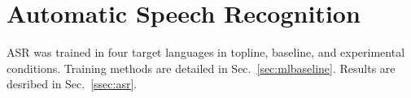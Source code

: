 \section{Automatic Speech Recognition}
\label{sec:methods}

ASR was trained in four target languages {\color{blue} in topline,
  baseline, and experimental conditions. Training methods are detailed
  in Sec.~\ref{sec:mlbaseline}.  Results are desribed in
  Sec.~\ref{ssec:asr}.}


